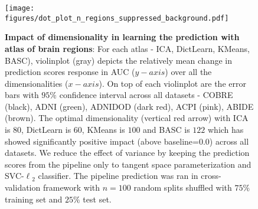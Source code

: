 \documentclass[5p]{elsarticle}
\begin{document}
\begin{figure}
    \centerline{%
	\texttt{[image: figures/dot\_plot\_n\_regions\_suppressed\_background.pdf]}%
    }%
    \caption[]{\textbf{Impact of dimensionality in learning the prediction with atlas of
            brain regions}: For each atlas - ICA, DictLearn, KMeans, BASC),
            violinplot (gray) depicts the relatively mean change in prediction
            scores response in AUC ($y-axis$) over all the dimensionalities
            ($x-axis$). On top of each violinplot are the error bars with
            $95\%$ confidence interval across all datasets - COBRE (black),
            ADNI (green), ADNIDOD (dark red), ACPI (pink), ABIDE (brown).
            The optimal dimensionality (vertical red arrow) with
            ICA is $80$, DictLearn is $60$,
            KMeans is $100$ and BASC is $122$ which has showed significantly
            positive impact (above baseline=$0.0$) across all datasets. We
            reduce the effect of variance by keeping the prediction scores
            from the pipeline only to tangent space parameterization and
            SVC-$\ell{_2}$ classifier. The pipeline prediction was ran in
            cross-validation framework with $n=100$ random splits shuffled with
            $75\%$ training set and $25\%$ test set.}
    \label{fig:effect_size_in_regions}
\end{figure}
\end{document}
